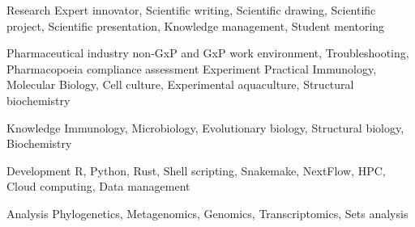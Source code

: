 

\begin{cvskills}

  \cvskill
    {Research} %
    {Expert innovator, Scientific writing, Scientific drawing, Scientific project, Scientific presentation, \hfill \break Knowledge management, Student mentoring} %
    
  \cvskill
    {Pharmaceutical industry} %
    {non-GxP and GxP work environment, Troubleshooting, Pharmacopoeia compliance assessment} %
  \cvskill
    {Experiment} %
    {Practical Immunology, Molecular Biology, Cell culture, Experimental aquaculture, Structural biochemistry} %
    
  \cvskill
    {Knowledge} %
    {Immunology, Microbiology, Evolutionary biology, Structural biology, Biochemistry} %
    
  \cvskill
    {Development} %
    {R, Python, Rust, Shell scripting, Snakemake, NextFlow, HPC, Cloud computing, Data management} %
    
  \cvskill
    {Analysis} %
    {Phylogenetics, Metagenomics, Genomics, Transcriptomics, Sets analysis} %

\end{cvskills}